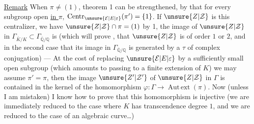 \uline{Remark} When $\pi\neq(1)$,  theorem 1 can be strengthened,  by  that for every subgroup  open \uline{in $\pi$}, $\operatorname{Centr}_{\unsure{\mathcal E|E|\varepsilon}}(\pi')=\{1\}$. If $\unsure{Z|\mathcal Z}$ is this centralizer, we have $\unsure{Z|\mathcal Z}\cap\pi=(1)$ by  1,  the image of $\unsure{Z|\mathcal Z}$ in $\Gamma_{\bar K/K}\subset\Gamma_{\overline{\mathbb Q}/\mathbb Q}$ is  (which will prove  , that $\unsure{Z|\mathcal Z}$ is of order $1$ or $2$, and in the second case that its image in $\Gamma_{\overline{\mathbb Q}/\mathbb Q}$ is  generated by a $\tau$ of complex conjugation) --- At the cost of replacing $\unsure{\mathcal E|E|\varepsilon}$ by a sufficiently small open subgroup (which amounts to passing to a finite extension of $K$) we may assume $\pi'=\pi$, then the image $\unsure{Z'|\mathcal Z'}$ of $\unsure{Z|\mathcal Z}$ in $\Gamma$ is contained in the kernel of the homomorphism $\varphi:\Gamma\longrightarrow\operatorname{Aut\,ext}(\pi)$. Now (unless I am mistaken) I know how to prove that this homomorphism is injective (we are immediately reduced to the case where $K$ has transcendence degree $1$, and we are reduced to the case  of an algebraic curve\ldots)
